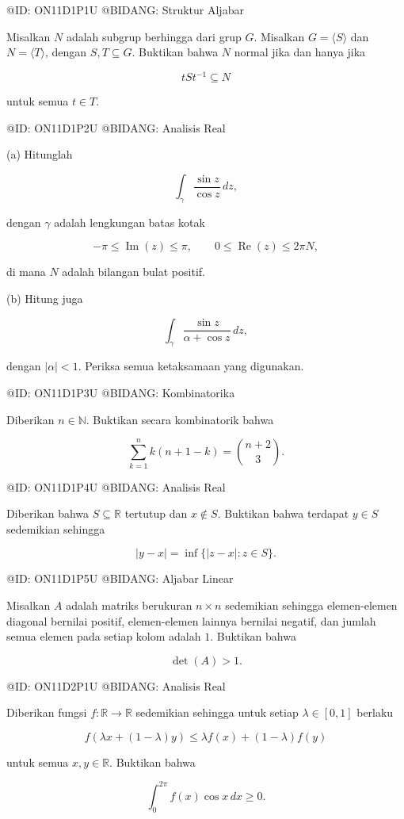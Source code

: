 @ID: ON11D1P1U
@BIDANG: Struktur Aljabar

Misalkan $N$ adalah subgrup berhingga dari grup $G$. Misalkan $G=\langle S\rangle$ dan $N=\langle T\rangle$, dengan $S,T\subseteq G$. Buktikan bahwa $N$ normal jika dan hanya jika

$$
tSt^{-1}\subseteq N
$$

untuk semua $t\in T$.

@ID: ON11D1P2U
@BIDANG: Analisis Real

(a) Hitunglah

$$
\int_\gamma \frac{\sin z}{\cos z}\,dz,
$$

dengan $\gamma$ adalah lengkungan batas kotak

$$
-\pi\le\operatorname{Im}(z)\le\pi,\qquad
0\le\operatorname{Re}(z)\le2\pi N,
$$

di mana $N$ adalah bilangan bulat positif.

(b) Hitung juga

$$
\int_\gamma \frac{\sin z}{\alpha+\cos z}\,dz,
$$

dengan $|\alpha|<1$. Periksa semua ketaksamaan yang digunakan.

@ID: ON11D1P3U
@BIDANG: Kombinatorika

Diberikan $n\in\mathbb N$. Buktikan secara kombinatorik bahwa

$$
\sum_{k=1}^{n}k(n+1-k)
=
\binom{n+2}{3}.
$$

@ID: ON11D1P4U
@BIDANG: Analisis Real

Diberikan bahwa $S\subseteq\mathbb R$ tertutup dan $x\notin S$. Buktikan bahwa terdapat $y\in S$ sedemikian sehingga

$$
|y-x|
=
\inf\{|z-x|:z\in S\}.
$$

@ID: ON11D1P5U
@BIDANG: Aljabar Linear

Misalkan $A$ adalah matriks berukuran $n\times n$ sedemikian sehingga elemen-elemen diagonal bernilai positif, elemen-elemen lainnya bernilai negatif, dan jumlah semua elemen pada setiap kolom adalah $1$. Buktikan bahwa

$$
\det(A)>1.
$$

@ID: ON11D2P1U
@BIDANG: Analisis Real

Diberikan fungsi $f:\mathbb R\to\mathbb R$ sedemikian sehingga untuk setiap $\lambda\in[0,1]$ berlaku

$$
f(\lambda x+(1-\lambda)y)
\le
\lambda f(x)+(1-\lambda)f(y)
$$

untuk semua $x,y\in\mathbb R$. Buktikan bahwa

$$
\int_0^{2\pi}f(x)\cos x\,dx\ge0.
$$

